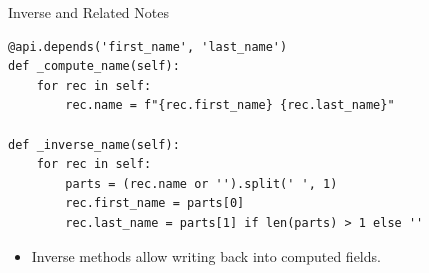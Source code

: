 \begin{frame}[fragile]{Inverse and Related Notes}
\begin{lstlisting}
@api.depends('first_name', 'last_name')
def _compute_name(self):
	for rec in self:
		rec.name = f"{rec.first_name} {rec.last_name}"

def _inverse_name(self):
	for rec in self:
		parts = (rec.name or '').split(' ', 1)
		rec.first_name = parts[0]
		rec.last_name = parts[1] if len(parts) > 1 else ''
\end{lstlisting}
	\begin{itemize}
		\item Inverse methods allow writing back into computed fields.
	\end{itemize}
\end{frame}
